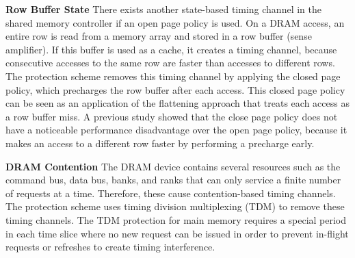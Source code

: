 \textbf{Row Buffer State}
There exists another state-based timing channel in the shared memory controller
if an open page policy is used. On a DRAM access, an entire row is read from
a memory array and stored in a row buffer (sense amplifier). If this buffer is
used as a cache, it creates a timing channel, because consecutive accesses to 
the same row are faster than accesses to different rows.
The protection scheme removes this timing channel by applying the closed page
policy, which precharges the row buffer after each access. This
closed page policy can be seen as an application of the flattening approach that
treats each access as a row buffer miss.
A previous study \cite{ushpca14} showed that the close page policy does
not have a noticeable performance disadvantage over the open page policy, because it
makes an access to a different row faster by performing a precharge early.

\textbf{DRAM Contention}
The DRAM device contains several resources such as the command bus, data
bus, banks, and ranks that can only service a finite number of requests at a time. 
Therefore, these cause contention-based timing channels.
The protection scheme uses timing division multiplexing (TDM) to remove these
timing channels. The TDM protection for main memory requires a special period 
in each time slice where no new
request can be issued in order to prevent in-flight requests or refreshes to
create timing interference.


